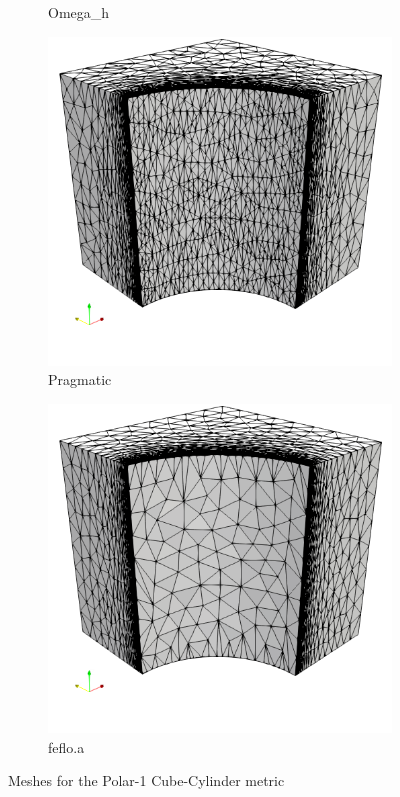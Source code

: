 \documentclass[3p,times,procedia,number]{elsarticle}
\begin{document}
\begin{figure}
\begin{subfigure}{.24\textwidth}
\caption{Omega\_h}
\label{fig:omega_h-cube-cylinder-polar-1-mesh}
\end{subfigure}
\begin{subfigure}{.24\textwidth}
\centering
\includegraphics[width=\textwidth]{pragmatic-cube-cylinder-polar-1.png}
\caption{Pragmatic}
\end{subfigure}
\begin{subfigure}{.24\textwidth}
\centering
\includegraphics[width=\textwidth]{fefloa-cube-cylinder-polar-1.png}
\caption{feflo.a}
\label{fig:fefloa-cube-cylinder-polar-1-mesh}
\end{subfigure}
\caption{Meshes for the Polar-1 Cube-Cylinder metric}
\label{fig:cube-cylinder-polar-1-meshes}
\end{figure}
\end{document}

